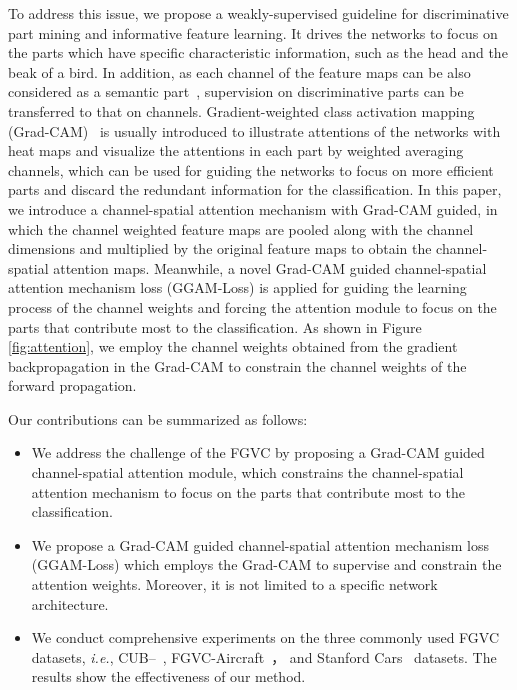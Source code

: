\documentclass{article}
\begin{document}
To address this issue, we propose a weakly-supervised guideline for discriminative part mining and informative feature learning. It drives the networks to focus on the parts which have specific characteristic information, such as the head and the beak of a bird. In addition, as each channel of the feature maps can be also considered as a semantic part~\cite{MA-CNN}, supervision on discriminative parts can be transferred to that on channels. Gradient-weighted class activation mapping (Grad-CAM)~\cite{cam} is usually introduced to illustrate attentions of the networks with heat maps and visualize the attentions in each part by weighted averaging channels, which can be used for guiding the networks to focus on more efficient parts and discard the redundant information for the classification. In this paper, we introduce a channel-spatial attention mechanism with Grad-CAM guided, in which the channel weighted feature maps are pooled along with the channel dimensions and multiplied by the original feature maps to obtain the channel-spatial attention maps. Meanwhile, a novel Grad-CAM guided channel-spatial attention mechanism loss (GGAM-Loss) is applied for guiding the learning process of the channel weights and forcing the attention module to focus on the parts that contribute most to the classification. As shown in Figure \ref{fig:attention}, we employ the channel weights obtained from the gradient backpropagation in the Grad-CAM to constrain the channel weights of the forward propagation. 

Our contributions can be summarized as follows:
\vspace{-1mm}
\begin{itemize}
	\item We address the challenge of the FGVC by proposing a Grad-CAM guided channel-spatial attention module, which constrains the channel-spatial attention mechanism to focus on the parts that contribute most to the classification.
\vspace{-1mm}	
	\item We propose a Grad-CAM guided channel-spatial attention mechanism loss (GGAM-Loss) which employs the Grad-CAM to supervise and constrain the attention weights. Moreover, it is not limited to a specific network architecture.
\vspace{-1mm}	
	\item We conduct comprehensive experiments on the three commonly used FGVC datasets, \emph{i.e.}, CUB--~\cite{birds},  FGVC-Aircraft~\cite{air}， and Stanford Cars~\cite{cars} datasets. The results show the effectiveness of our method.
\end{itemize}
\vspace{-3mm}
\end{document}
